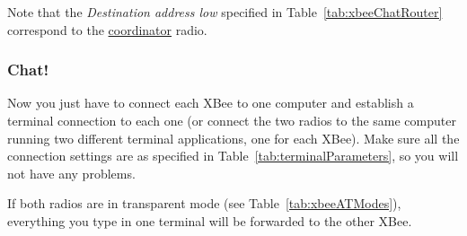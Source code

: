 Note that the \emph{Destination address low} specified in Table~\ref{tab:xbeeChatRouter} correspond to the \underline{coordinator} radio.

\subsubsection{Chat!}
Now you just have to connect each XBee to one computer and establish a terminal connection to each one (or connect the two radios to the same computer running two different terminal applications, one for each XBee). Make sure all the connection settings are as specified in Table~\ref{tab:terminalParameters}, so you will not have any problems.

If both radios are in transparent mode (see Table~\ref{tab:xbeeATModes}), everything you type in one terminal will be forwarded to the other XBee.